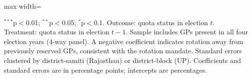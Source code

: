 \begin{adjustbox}{max width=\linewidth}
\begin{threeparttable}[b]
      \begin{tablenotes}
         \item $^{***}$p$<$0.01; $^{**}$p$<$0.05; $^{*}$p$<$0.1. Outcome: quota status in election $t$. Treatment: quota status in election $t-1$. Sample includes GPs present in all four election years (4-way panel). A negative coefficient indicates rotation away from previously reserved GPs, consistent with the rotation mandate. Standard errors clustered by district-samiti (Rajasthan) or district-block (UP). Coefficients and standard errors are in percentage points; intercepts are percentages.
      \end{tablenotes}
   \end{threeparttable}
\end{adjustbox}
\par\endgroup


